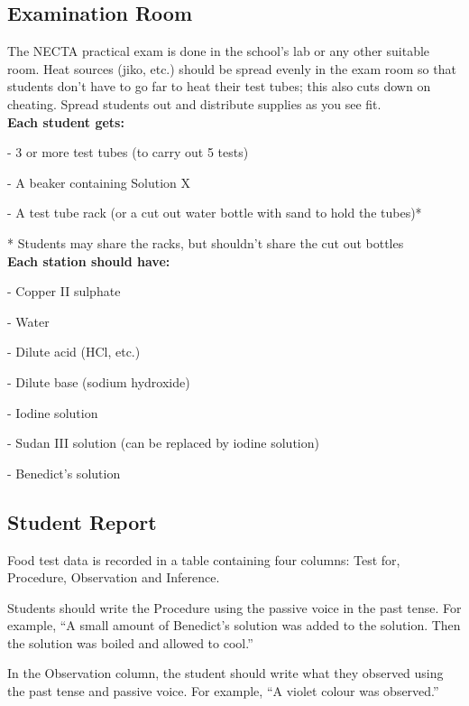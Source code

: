 \subsection{Examination Room}
The NECTA practical exam is done in the school's lab or any other suitable room. Heat sources (jiko, etc.) should be spread evenly in the exam room so that students don't have to go far to heat their test tubes; this also cuts down on cheating. Spread students out and distribute supplies as you see fit.\\

\noindent \textbf{Each student gets:}
\begin{itemize*}
\item[-] 3 or more test tubes (to carry out 5 tests)
\item[-] A beaker containing Solution X
\item[-] A test tube rack (or a cut out water bottle with sand to hold the tubes)*
\end{itemize*}
* Students may share the racks, but shouldn't share the cut out bottles\\

\noindent \textbf{Each station should have:}
\begin{itemize*}
\item[-] Copper II sulphate
\item[-] Water
\item[-] Dilute acid (HCl, etc.)
\item[-] Dilute base (sodium hydroxide)
\item[-] Iodine solution
\item[-] Sudan III solution (can be replaced by iodine solution)
\item[-] Benedict's solution
\end{itemize*}

\subsection{Student Report}
Food test data is recorded in a table containing four columns: Test for, Procedure, Observation and Inference.

Students should write the Procedure using the passive voice in the past tense. For example, ``A small amount of Benedict's solution was added to the solution. Then the solution was boiled and allowed to cool.''

In the Observation column, the student should write what they observed using the past tense and passive voice. For example, ``A violet colour was observed.''

